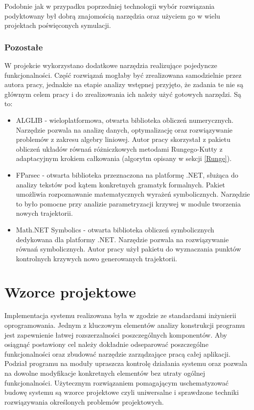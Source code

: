\documentclass[12pt, oneside]{report}
\theoremstyle{definition}
\begin{document}
Podobnie jak w przypadku poprzedniej technologii wybór rozwiązania podyktowany był dobrą znajomością narzędzia oraz użyciem go w wielu projektach poświęconych symulacji. 


\subsubsection{Pozostałe}
W projekcie wykorzystano dodatkowe narzędzia realizujące pojedyncze funkcjonalności. Część rozwiązań mogłaby być zrealizowana samodzielnie przez autora pracy, jednakże na etapie analizy wstępnej przyjęto, że zadania te nie są głównym celem pracy i do zrealizowania ich należy użyć gotowych narzędzi. Są to:
\begin{itemize}
\item ALGLIB - wieloplatformowa, otwarta biblioteka obliczeń numerycznych. Narzędzie pozwala na analizę danych, optymalizację oraz rozwiązywanie problemów z zakresu algebry liniowej. Autor pracy skorzystał z pakietu obliczeń układów równań różniczkowych metodami Rungego-Kutty z adaptacyjnym krokiem całkowania (algorytm opisany w sekcji \ref{Runge}). 
\item FParsec - otwarta biblioteka przeznaczona na platformę .NET, służąca do analizy tekstów pod kątem konkretnych gramatyk formalnych. Pakiet umożliwia rozpoznawanie matematycznych wyrażeń symbolicznych. Narzędzie to było pomocne przy analizie parametryzacji krzywej w module tworzenia nowych trajektorii.
\item Math.NET Symbolics - otwarta biblioteka obliczeń symbolicznych dedykowana dla platformy .NET. Narzędzie pozwala na rozwiązywanie równań symbolicznych. Autor pracy użył pakietu do wyznaczania punktów kontrolnych krzywych nowo generowanych trajektorii.
\end{itemize}

\section{Wzorce projektowe}
Implementacja systemu realizowana była w zgodzie ze standardami inżynierii oprogramowania. Jednym z kluczowym elementów analizy konstrukcji programu jest zapewnienie łatwej rozszerzalności poszczególnych komponentów. Aby osiągnąć postawiony cel należy dokładnie odseparować poszczególne funkcjonalności oraz zbudować narzędzie zarządzające pracą całej aplikacji. Podział programu na moduły upraszcza kontrolę działania systemu oraz pozwala na dowolne modyfikacje konkretnych elementów bez utraty ogólnej funkcjonalności. Użytecznym rozwiązaniem pomagającym uschematyzować budowę systemu są wzorce projektowe czyli uniwersalne i sprawdzone techniki rozwiązywania określonych problemów projektowych. 
\end{document}
